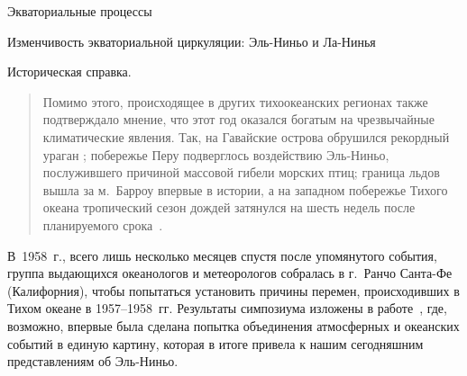 \begin{chapter}{Экваториальные процессы}
\begin{section}{Изменчивость экваториальной циркуляции: Эль-Ниньо и Ла-Нинья}
\begin{paragraph}{Историческая справка.}
\begin{quotation}
Помимо этого, происходящее в других тихоокеанских регионах также подтверждало
мнение, что этот год оказался богатым на чрезвычайные климатические явления.
Так, на Гавайские острова обрушился рекордный ураган%
;
побережье Перу подверглось воздействию Эль-Ниньо, послужившего причиной 
массовой гибели морских птиц; граница льдов вышла за м.~Барроу впервые 
в истории, а на западном побережье Тихого океана тропический сезон дождей 
затянулся на шесть недель после планируемого 
срока~\cite{Sette:1960}.
%
\end{quotation}

В~1958~г., всего лишь несколько месяцев спустя после упомянутого события, 
группа выдающихся океанологов и метеорологов 
собралась в г.~Ранчо Санта-Фе (Калифорния), чтобы попытаться установить 
причины перемен, происходивших в Тихом океане в 1957--1958~гг. 
Результаты симпозиума изложены в работе~\cite{Sette:1960}, где, 
возможно, впервые была сделана попытка объединения атмосферных и океанских 
событий в единую картину, которая в итоге привела к нашим сегодняшним 
представлениям об Эль-Ниньо.
%


\end{paragraph}
\end{section}
\end{chapter}
